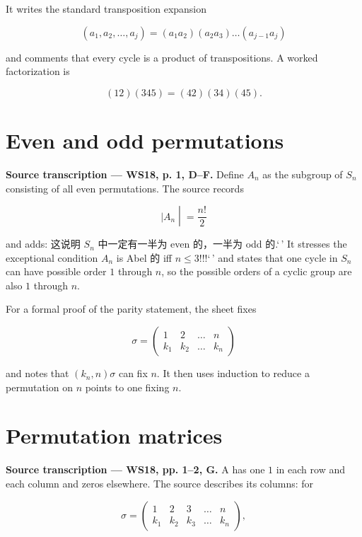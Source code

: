 It writes the standard transposition expansion

\[\left( {a_{1},a_{2},\ldots,a_{j}} \right) = \left( {a_{1}a_{2}} \right)\left( {a_{2}a_{3}} \right)\ldots\left( {a_{j - 1}a_{j}} \right)\]

and comments that every cycle is a product of transpositions. A worked factorization is

\[\left( {12} \right)\left( {345} \right) = \left( {42} \right)\left( {34} \right)\left( {45} \right).\]

\section{Even and odd permutations}

\textbf{Source transcription --- WS18, p. 1, D--F.} Define \(A_{n}\) as the subgroup of \(S_{n}\) consisting of all even permutations. The source records

\[\left. |A_{n} \middle| = \frac{n!}{2} \right.\]

and adds: 这说明 \(S_{n}\) 中一定有一半为 even 的，一半为 odd 的.`\,' It stresses the exceptional condition \(A_{n}\) is Abel 的 iff \(n \leq 3\)!!!{\kern0pt}`\,' and states that one cycle in \(S_{n}\) can have possible order \(1\) through \(n\), so the possible orders of a cyclic group are also \(1\) through \(n\).

For a formal proof of the parity statement, the sheet fixes

\[\sigma = \begin{pmatrix}
1 & 2 & \ldots & n \\
k_{1} & k_{2} & \ldots & k_{n}
\end{pmatrix}\]

and notes that \(\left( {k_{n},n} \right)\sigma\) can fix \(n\). It then uses induction to reduce a permutation on \(n\) points to one fixing \(n\).

\section{Permutation matrices}

\textbf{Source transcription --- WS18, pp. 1--2, G.} A  has one \(1\) in each row and each column and zeros elsewhere. The source describes its columns: for

\[\sigma = \begin{pmatrix}
1 & 2 & 3 & \ldots & n \\
k_{1} & k_{2} & k_{3} & \ldots & k_{n}
\end{pmatrix},\]

